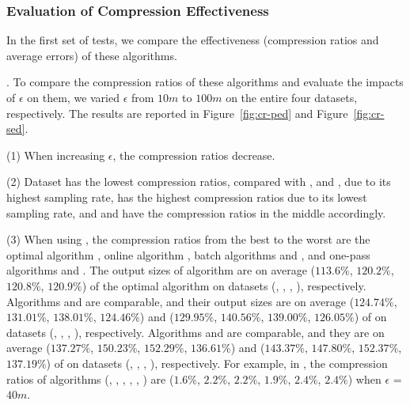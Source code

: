 \subsubsection{Evaluation of Compression Effectiveness}

In the first set of tests, we compare the effectiveness (compression ratios and average errors) of these algorithms.%

. 
To compare the compression ratios of these algorithms and evaluate the impacts of $\epsilon$ on them, we varied $\epsilon$ from $10m$ to $100m$ on the entire four datasets, respectively.
The results are reported in Figure~\ref{fig:cr-ped} and Figure~\ref{fig:cr-sed}.


\sstab (1) When increasing $\epsilon$, the compression ratios decrease. 

\sstab (2) Dataset \act has the lowest compression ratios, compared with \ucar, \geolife and \mopsi, due to its highest sampling rate, \ucar has the highest compression ratios due to its lowest sampling rate, and \geolife and \mopsi have the compression ratios in the middle accordingly.

\sstab (3) When using \ped, the compression ratios from the best
to the worst are the optimal algorithm \optp, online algorithm \bqsa, batch algorithms \tpa and
\dpa, and one-pass algorithms \siped and \operb. 
The output sizes of algorithm \bqsa are on average
($113.6\%$, $120.2\%$, $120.8\%$, $120.9\%$) of the optimal algorithm \optp
on datasets (\ucar, \geolife, \mopsi, \act), respectively. 
Algorithms \tpa and \dpa are comparable, and their output sizes are on average
($124.74\%$, $131.01\%$, $138.01\%$, $124.46\%$) and ($129.95\%$, $140.56\%$,
$139.00\%$, $126.05\%$) of \optp
on datasets (\ucar, \geolife, \mopsi, \act), respectively.
Algorithms \siped and \operb are comparable, and they are on average
($137.27\%$, $150.23\%$, $152.29\%$, $136.61\%$)
and ($143.37\%$, $147.80\%$, $152.37\%$, $137.19\%$) of \optp on datasets (\ucar, \geolife, \mopsi, \act), respectively.
%
For example, in \mopsi, the compression ratios of algorithms
(\optp, \tpa, \dpa, \bqsa, \siped, \operb ) are ($1.6\%$, $2.2\%$, $2.2\%$, $1.9\%$, $2.4\%$, $2.4\%$) when $\epsilon$ = $40m$.

